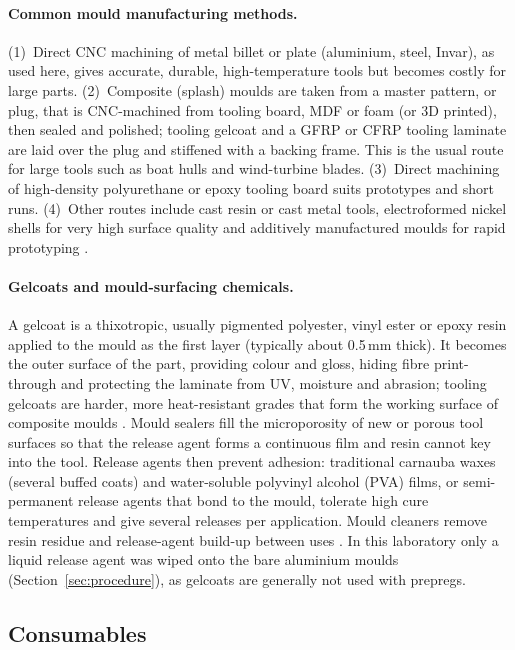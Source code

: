 \documentclass[11pt,a4paper]{article}
\newenvironment{addedblock}{\color{addgreen}}{}
\newenvironment{addedblock}{}{}
\begin{document}
\begin{addedblock}
\paragraph{Common mould manufacturing methods.}
(1)~Direct CNC machining of metal billet or plate (aluminium, steel,
Invar), as used here, gives accurate, durable, high-temperature tools
but becomes costly for large parts. (2)~Composite (splash) moulds are
taken from a master pattern, or plug, that is CNC-machined from
tooling board, MDF or foam (or 3D printed), then sealed and polished;
tooling gelcoat and a GFRP or CFRP tooling laminate are laid over the
plug and stiffened with a backing frame. This is the usual route for
large tools such as boat hulls and wind-turbine blades. (3)~Direct
machining of high-density polyurethane or epoxy tooling board suits
prototypes and short runs. (4)~Other routes include cast resin or cast
metal tools, electroformed nickel shells for very high surface quality
and additively manufactured moulds for rapid prototyping
\citep{campbell2004,astrom1997}.

\paragraph{Gelcoats and mould-surfacing chemicals.}
A gelcoat is a thixotropic, usually pigmented polyester, vinyl ester
or epoxy resin applied to the mould as the first layer (typically
about 0.5\,mm thick). It becomes the outer surface of the part,
providing colour and gloss, hiding fibre print-through and protecting
the laminate from UV, moisture and abrasion; tooling gelcoats are
harder, more heat-resistant grades that form the working surface of
composite moulds \citep{astrom1997}. Mould sealers fill the
microporosity of new or porous tool surfaces so that the release agent
forms a continuous film and resin cannot key into the tool. Release
agents then prevent adhesion: traditional carnauba waxes (several
buffed coats) and water-soluble polyvinyl alcohol (PVA) films, or
semi-permanent release agents that bond to the mould, tolerate high
cure temperatures and give several releases per application. Mould
cleaners remove resin residue and release-agent build-up between uses
\citep{explorecomposites_release}. In this laboratory only a liquid
release agent was wiped onto the bare aluminium moulds
(Section~\ref{sec:procedure}), as gelcoats are generally not used with
prepregs.

\subsection{Consumables}
\label{sec:consumables}
\end{addedblock}
\end{document}
